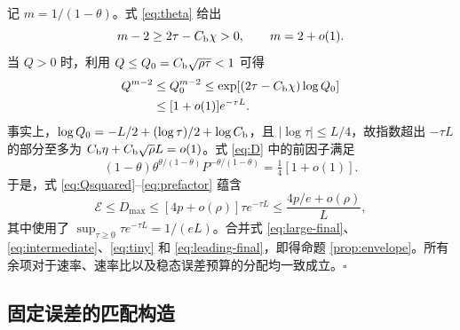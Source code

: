 \documentclass[aps,pra,reprint,amsmath,amssymb,nofootinbib,floatfix,longbibliography]{revtex4-2}
\theoremstyle{aps}
\begin{document}
记 $m=1/(1-\theta)$。式 \eqref{eq:theta} 给出
\begin{equation}\label{eq:mexp}
 m-2\ge2\tau-C_{\rm b}\chi>0,\qquad m=2+o(1).
\end{equation}
当 $Q>0$ 时，利用 $Q\le Q_0=C_{\rm b}\sqrt{\rho\tau}<1$ 可得
\begin{align}
 Q^{m-2}&\le Q_0^{m-2}
 \le\exp[(2\tau-C_{\rm b}\chi)\log Q_0]\nonumber\\
 &\le[1+o(1)]e^{-\tau L}.\label{eq:extra-exponent}
\end{align}
事实上，$\log Q_0=-L/2+(\log\tau)/2+\log C_{\rm b}$，且 $|\log\tau|\le L/4$，故指数超出 $-\tau L$ 的部分至多为 $C_{\rm b}\eta+C_{\rm b}\sqrt\rho L=o(1)$。式 \eqref{eq:D} 中的前因子满足
\begin{equation}\label{eq:prefactor}
 (1-\theta)\theta^{\theta/(1-\theta)}
 P^{-\theta/(1-\theta)}=\tfrac14[1+o(1)].
\end{equation}
于是，式 \eqref{eq:Qsquared}--\eqref{eq:prefactor} 蕴含
\begin{equation}\label{eq:leading-final}
 \mathcal E\le D_{\max}\le[4p+o(\rho)]\tau e^{-\tau L}
 \le\frac{4p/e+o(\rho)}L,
\end{equation}
其中使用了 $\sup_{\tau\ge0}\tau e^{-\tau L}=1/(eL)$。合并式 \eqref{eq:large-final}、\eqref{eq:intermediate}、\eqref{eq:tiny} 和 \eqref{eq:leading-final}，即得命题 \ref{prop:envelope}。所有余项对于速率、速率比以及稳态误差预算的分配均一致成立。\hfill$\square$

\subsection{固定误差的匹配构造}\label{app:unrestricted-sharpness}\label{sec:sharpness}
\end{document}
